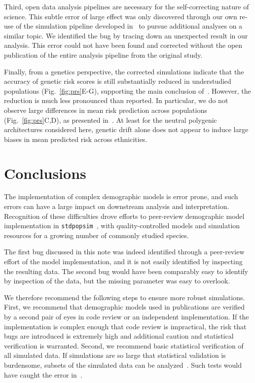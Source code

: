 \documentclass{article}
\newcommand{\stdpopsim}[0]{\texttt{stdpopsim}}
\begin{document}
Third, open data analysis pipelines are necessary for the self-correcting nature of science.
This subtle error of large effect was only discovered through our own re-use of
the simulation pipeline developed in~\citet{martin2017human} to pursue
additional analyses on a similar topic. We identified the bug by tracing down an unexpected
result in our analysis. This error could not have been found and corrected without the open
publication of the entire analysis pipeline from the original study.

Finally, from a genetics perspective, the corrected simulations indicate that
the accuracy of genetic risk scores is still substantially reduced in understudied
populations (Fig.~\ref{fig:prs}E-G), supporting the main conclusion of~\citet{martin2017human}.
However, the reduction is much less pronounced than reported.
In particular, we do not observe large differences in mean risk prediction
across populations (Fig.~\ref{fig:prs}C,D), as presented in~\citet{martin2017human}.
At least for the neutral polygenic architectures considered here, genetic drift alone
does not appear to induce large biases in mean predicted risk across ethnicities.

\section{Conclusions}

The implementation of complex demographic models is error prone, and such errors
can have a large impact on downstream analysis and interpretation.
Recognition of these difficulties drove efforts to peer-review demographic model
implementation in \stdpopsim~\citep{adrion2019community}, with quality-controlled
models and simulation resources for a growing number of commonly studied species.

The first bug discussed in this note was indeed identified through a peer-review effort of the
model implementation, and it is not easily identified by inspecting the resulting data.
The second bug would have been comparably easy to identify by inspection
of the data, but the missing parameter was easy to overlook.

We therefore recommend the following steps to ensure more robust simulations.
First, we recommend that demographic models used in publications
are verified by a second pair of eyes in code review or an independent implementation.
If the implementation is complex enough that code review is impractical, the risk
that bugs are introduced is extremely high and additional caution and statistical
verification is warranted.
Second, we recommend basic statistical verification of all simulated data.
If simulations are so large that statistical validation is burdensome,
subsets of the simulated data can be analyzed~\citep{ralph2020efficiently}.
Such tests would have caught the error in~\citet{martin2017human}.
\end{document}
